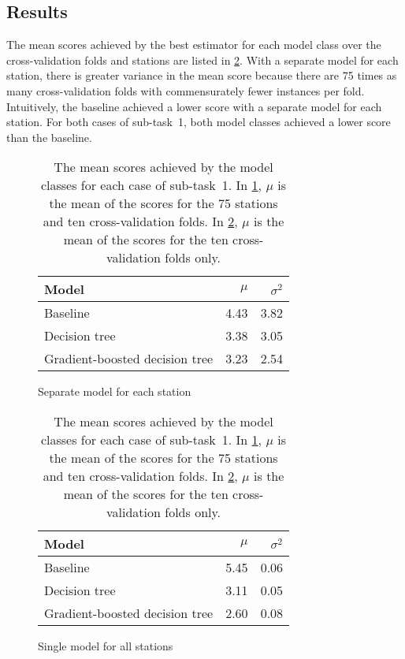 \documentclass[11pt]{extarticle}
\begin{document}
\subsection{Results}
\label{sec:subtask-1:results}

The mean scores achieved by the best estimator for each model class over the
cross-validation folds and stations are listed in \cref{tab:subtask-1:results}.
With a separate model for each station, there is greater variance in the mean score
because there are 75 times as many cross-validation folds with commensurately fewer
instances per fold.
Intuitively, the baseline achieved a lower score with a separate model for each
station.
For both cases of sub-task~1, both model classes achieved a lower score than the
baseline.

\begin{table}
  \centering
  \begin{subfigure}{0.49\textwidth}
    \centering
    \begin{tabular}{lrr}
      \toprule
      Model                          & $\mu$ & $\sigma^2$
      \\
      \midrule
      Baseline                       & 4.43  & 3.82
      \\
      Decision tree                  & 3.38  & 3.05
      \\
      Gradient-boosted decision tree & 3.23  & 2.54
      \\
      \bottomrule
    \end{tabular}
    \caption{Separate model for each station}
    \label{tab:subtask-1:results-1}
  \end{subfigure}
  \begin{subfigure}{0.49\textwidth}
    \centering
    \begin{tabular}{lrr}
      \toprule
      Model                          & $\mu$ & $\sigma^2$
      \\
      \midrule
      Baseline                       & 5.45  & 0.06
      \\
      Decision tree                  & 3.11  & 0.05
      \\
      Gradient-boosted decision tree & 2.60  & 0.08
      \\
      \bottomrule
    \end{tabular}
    \caption{Single model for all stations}
    \label{tab:subtask-1:results-2}
  \end{subfigure}
  \caption{The mean scores achieved by the model classes for each case of sub-task~1.
    In \cref{tab:subtask-1:results-1}, $\mu$ is the mean of the scores for the 75 stations
    and ten cross-validation folds.
    In \cref{tab:subtask-1:results-2}, $\mu$ is the mean of the scores for the ten
    cross-validation folds only.
  }
  \label{tab:subtask-1:results}
\end{table}
\end{document}
